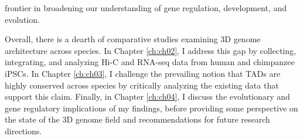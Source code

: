 frontier in broadening our understanding of gene regulation, development, and evolution.

Overall, there is a dearth of comparative studies examining 3D genome architecture across species. In Chapter \ref{ch:ch02}, I address this gap by collecting, integrating, and analyzing Hi-C and RNA-seq data from human and chimpanzee iPSCs. In Chapter \ref{ch:ch03}, I challenge the prevailing notion that TADs are highly conserved across species by critically analyzing the existing data that support this claim. Finally, in Chapter \ref{ch:ch04}, I discuss the evolutionary and gene regulatory implications of my findings, before providing some perspective on the state of the 3D genome field and recommendations for future research directions.
